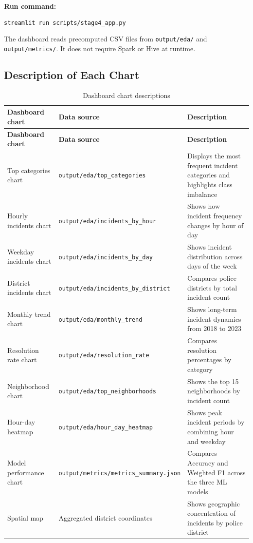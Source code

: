 \documentclass[12pt,a4paper]{article}
\begin{document}
\textbf{Run command:}

\begin{lstlisting}[language=bash]
streamlit run scripts/stage4_app.py
\end{lstlisting}

The dashboard reads precomputed CSV files from \texttt{output/eda/} and \texttt{output/metrics/}. It does not require Spark or Hive at runtime.

\subsection{Description of Each Chart}

\begin{longtable}{L{4cm} L{4cm} L{7cm}}
\caption{Dashboard chart descriptions}\\
\toprule
\textbf{Dashboard chart} & \textbf{Data source} & \textbf{Description} \\
\midrule
\endfirsthead
\toprule
\textbf{Dashboard chart} & \textbf{Data source} & \textbf{Description} \\
\midrule
\endhead
Top categories chart & \texttt{output/eda/top\_categories} & Displays the most frequent incident categories and highlights class imbalance \\
Hourly incidents chart & \texttt{output/eda/incidents\_by\_hour} & Shows how incident frequency changes by hour of day \\
Weekday incidents chart & \texttt{output/eda/incidents\_by\_day} & Shows incident distribution across days of the week \\
District incidents chart & \texttt{output/eda/incidents\_by\_district} & Compares police districts by total incident count \\
Monthly trend chart & \texttt{output/eda/monthly\_trend} & Shows long-term incident dynamics from 2018 to 2023 \\
Resolution rate chart & \texttt{output/eda/resolution\_rate} & Compares resolution percentages by category \\
Neighborhood chart & \texttt{output/eda/top\_neighborhoods} & Shows the top 15 neighborhoods by incident count \\
Hour-day heatmap & \texttt{output/eda/hour\_day\_heatmap} & Shows peak incident periods by combining hour and weekday \\
Model performance chart & \texttt{output/metrics/metrics\_summary.json} & Compares Accuracy and Weighted F1 across the three ML models \\
Spatial map & Aggregated district coordinates & Shows geographic concentration of incidents by police district \\
\bottomrule
\end{longtable}
\end{document}
